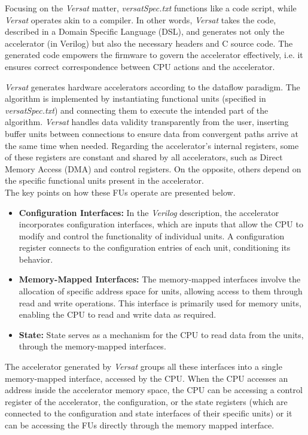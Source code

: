 Focusing on the \textit{Versat} matter, \textit{versatSpec.txt} functions like a code script, while \textit{Versat} operates akin to a compiler. In other words, \textit{Versat} takes the code, described in a Domain Specific Language (DSL), and generates not only the accelerator (in Verilog) but also the necessary headers and C source code. The generated code empowers the firmware to govern the accelerator effectively, i.e. it ensures correct correspondence between CPU actions and the accelerator.

\textit{Versat} generates hardware accelerators according to the dataflow paradigm. The algorithm is implemented by instantiating functional units (specified in \textit{versatSpec.txt}) and connecting them to execute the intended part of the algorithm. \textit{Versat} handles data validity transparently from the user, inserting buffer units between connections to ensure data from convergent paths arrive at the same time when needed.
Regarding the accelerator's internal registers, some of these registers are constant and shared by all accelerators, such as Direct Memory Access (DMA) and control registers. On the opposite, others depend on the specific functional units present in the accelerator.\\
The key points on how these FUs operate are presented below.

\begin{itemize}
    \item \textbf{Configuration Interfaces:} In the \textit{Verilog} description, the accelerator incorporates configuration interfaces, which are inputs that allow the CPU to modify and control the functionality of individual units. A configuration register connects to the configuration entries of each unit, conditioning its behavior. 
    \item \textbf{Memory-Mapped Interfaces:} The memory-mapped interfaces involve the allocation of specific address space for units, allowing access to them through read and write operations. This interface is primarily used for memory units, enabling the CPU to read and write data as required.
    \item \textbf{State:} State serves as a mechanism for the CPU to read data from the units, through the memory-mapped interfaces.
\end{itemize}

The accelerator generated by \textit{Versat} groups all these interfaces into a single memory-mapped interface, accessed by the CPU. When the CPU accesses an address inside the accelerator memory space, the CPU can be accessing a control register of the accelerator, the configuration, or the state registers (which are connected to the configuration and state interfaces of their specific units) or it can be accessing the FUs directly through the memory mapped interface.

